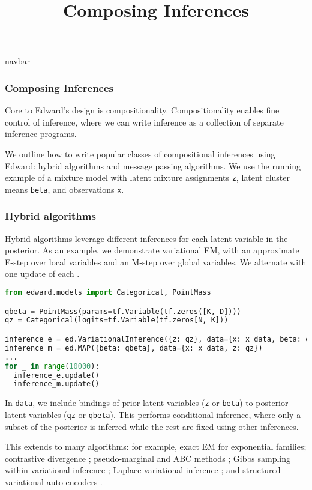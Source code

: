 \title{Composing Inferences}

{{navbar}}

\subsubsection{Composing Inferences}

Core to Edward's design is compositionality. Compositionality enables
fine control of inference, where we can write inference as a
collection of separate inference programs.

We outline how to write popular classes of compositional inferences
using Edward: hybrid algorithms and message passing algorithms.
We use the running example of a mixture model
with latent mixture assignments \texttt{z}, latent cluster means
\texttt{beta}, and observations \texttt{x}.

\subsubsection{Hybrid algorithms}

Hybrid algorithms leverage different inferences for each latent
variable in the posterior.
As an example, we demonstrate variational EM, with an approximate
E-step over local variables and an M-step over global variables.
We alternate with one update of each \citep{neal1993new}.

\begin{lstlisting}[language=Python]
from edward.models import Categorical, PointMass

qbeta = PointMass(params=tf.Variable(tf.zeros([K, D])))
qz = Categorical(logits=tf.Variable(tf.zeros[N, K]))

inference_e = ed.VariationalInference({z: qz}, data={x: x_data, beta: qbeta})
inference_m = ed.MAP({beta: qbeta}, data={x: x_data, z: qz})
...
for _ in range(10000):
  inference_e.update()
  inference_m.update()
\end{lstlisting}

In \texttt{data}, we include bindings of prior latent variables
(\texttt{z} or \texttt{beta}) to posterior latent variables
(\texttt{qz} or \texttt{qbeta}). This performs conditional inference,
where only a subset of the posterior is inferred while the rest are
fixed using other inferences.

This extends to many algorithms: for example,
exact EM for exponential families;
contrastive divergence \citep{hinton2002training};
pseudo-marginal and ABC methods \citep{andrieu2009pseudo};
Gibbs sampling within variational inference \citep{wang2012truncation};
Laplace variational inference \citep{wang2013variational};
and
structured variational auto-encoders \citep{johnson2016composing}.

